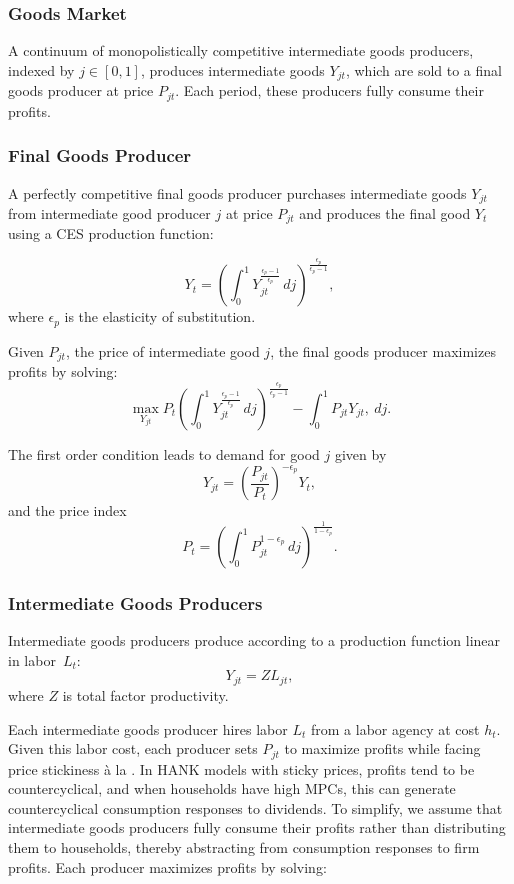 \subsubsection{Goods Market}

A continuum of monopolistically competitive intermediate goods producers, indexed by \( j \in [0,1] \), produces intermediate goods \( Y_{jt} \), which are sold to a final goods producer at price \( P_{jt} \). Each period, these producers fully consume their profits.


\subsubsection{Final Goods Producer}

A perfectly competitive final goods producer purchases intermediate goods \( Y_{jt} \) from intermediate good producer $j$ at price \( P_{jt} \) and produces the final good \( Y_t \) using a CES production function:

$$ Y_{t} = \left(\int_{0}^{1} Y_{jt}^{\frac{\epsilon_{p}-1}{\epsilon_{p}}}\, dj\right)^{\frac{\epsilon_{p}}{\epsilon_{p}-1}},$$ 
where $\epsilon_{p}$ is the elasticity of substitution.

Given $P_{jt}$, the price of intermediate good $j$, the final goods producer maximizes profits by solving:
$$ \max_{Y_{jt}} P_{t} \left(\int_{0}^{1} Y_{jt}^{\frac{\epsilon_{p}-1}{\epsilon_{p}}}\, dj\right)^{\frac{\epsilon_{p}}{\epsilon_{p}-1}} - \int_{0}^{1} P_{jt} Y_{jt} ,\ dj.$$ 

The first order condition leads to demand for good $j$ given by
$$Y_{jt} = \left(\frac {P_{jt}}{P_{t}}\right)^{- \epsilon_{p}} Y_{t},$$
and the price index
$$P_{t} = \left(\int_{0}^{1} P_{jt}^{1-\epsilon_{p}}\,dj \right )^{\frac{1}{1-\epsilon_{p}}}.$$


\subsubsection{Intermediate Goods Producers}

Intermediate goods producers produce according to a production function linear in labor~$L_{t}$: 
$$Y_{jt} =  Z L_{jt},$$ 
where $Z$ is total factor productivity.
  
Each intermediate goods producer hires labor \( L_t \) from a labor agency at cost \( h_t \). Given this labor cost, each producer sets \( P_{jt} \) to maximize profits while facing price stickiness à la \cite{Rotemberg1982}. In HANK models with sticky prices, profits tend to be countercyclical, and when households have high MPCs, this can generate countercyclical consumption responses to dividends. To simplify, we assume that intermediate goods producers fully consume their profits rather than distributing them to households, thereby abstracting from consumption responses to firm profits. Each producer maximizes profits by solving:

